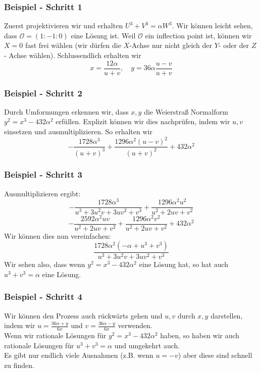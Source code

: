 \documentclass{beamer}
\begin{document}
\begin{frame}
\frametitle{Beispiel - Schritt 1}
	Zuerst projektivieren wir und erhalten $U^3+V^3 = \alpha W^3$.
	Wir können leicht sehen, dass \(\mathcal{O}=(1:-1:0)\) eine Lösung
	ist. Weil \(\mathcal{O}\) ein inflection point ist, können wir
	\(X=0\) fast frei wählen (wir dürfen die $X$-Achse nur nicht gleich
	der $Y$- oder der $Z$- Achse wählen).
	Schlussendlich erhalten wir
	\[x=\frac{12\alpha}{u+v}, \quad y=36\alpha\frac{u-v}{u+v}\]
\end{frame}

\begin{frame}
\frametitle{Beispiel - Schritt 2}
	Durch Umformungen erkennen wir, dass \(x,y\) die Weierstraß
	Normalform $y^2=x^3-432\alpha^2$ erfüllen.
	Explizit können wir dies nachprüfen, indem wir \(u,v\) einsetzen
	und ausmultiplizieren. So erhalten wir
	\[
		- \frac{1728 \alpha^{3}}{\left(u + v\right)^{3}} + \frac{1296 \alpha^{2} \left(u - v\right)^{2}}{\left(u + v\right)^{2}} + 432 \alpha^{2}
	\]
\end{frame}

\begin{frame}
\frametitle{Beispiel - Schritt 3}
	Ausmultiplizieren ergibt:
	\[ - \frac{1728 \alpha^{3}}{u^{3} + 3 u^{2} v + 3 u v^{2} + v^{3}} + \frac{1296 \alpha^{2} u^{2}}{u^{2} + 2 u v + v^{2}} \]
	\[- \frac{2592 \alpha^{2} u v}{u^{2} + 2 u v + v^{2}} + \frac{1296 \alpha^{2} v^{2}}{u^{2} + 2 u v + v^{2}} + 432 \alpha^{2}\]
	Wir können dies nun vereinfachen:
	\[ \frac{1728 \alpha^{2} \left(- \alpha + u^{3} + v^{3}\right)}{u^{3} + 3 u^{2} v + 3 u v^{2} + v^{3}} \]
	Wir sehen also, dass wenn \(y^2=x^3-432\alpha^2\) eine Lösung
	hat, so hat auch \(u^3+v^3=\alpha\) eine Lösung.
\end{frame}

\begin{frame}
\frametitle{Beispiel - Schritt 4}
	Wir können den Prozess auch rückwärts gehen und \(u,v\) durch
	\(x,y\) darstellen, indem wir
	$u=\frac{36\alpha+y}{6x}$ und $v=\frac{36\alpha-y}{6x}$ verwenden.
	\\
	Wenn wir rationale Lösungen für \(y^2=x^3-432\alpha^2\) haben,
	so haben wir auch rationale Lösungen für \(u^3+v^3=\alpha\) und
	umgekehrt auch.
	\\
	Es gibt nur endlich viele Ausnahmen (z.B. wenn \(u=-v\))
	aber diese sind schnell zu finden.
\end{frame}

\end{document}
